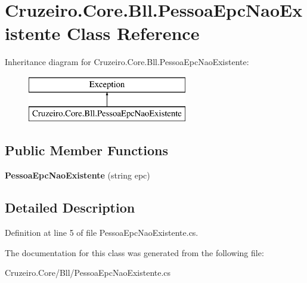 \hypertarget{class_cruzeiro_1_1_core_1_1_bll_1_1_pessoa_epc_nao_existente}{}\section{Cruzeiro.\+Core.\+Bll.\+Pessoa\+Epc\+Nao\+Existente Class Reference}
\label{class_cruzeiro_1_1_core_1_1_bll_1_1_pessoa_epc_nao_existente}
Inheritance diagram for Cruzeiro.\+Core.\+Bll.\+Pessoa\+Epc\+Nao\+Existente\+:\begin{figure}[H]
\begin{center}
\leavevmode
\includegraphics[height=2.000000cm]{class_cruzeiro_1_1_core_1_1_bll_1_1_pessoa_epc_nao_existente}
\end{center}
\end{figure}
\subsection*{Public Member Functions}
\begin{DoxyCompactItemize}
\item 
{\bfseries Pessoa\+Epc\+Nao\+Existente} (string epc)\hypertarget{class_cruzeiro_1_1_core_1_1_bll_1_1_pessoa_epc_nao_existente_af2b5bbc72701138c5b437949f446e6ab}{}\label{class_cruzeiro_1_1_core_1_1_bll_1_1_pessoa_epc_nao_existente_af2b5bbc72701138c5b437949f446e6ab}

\end{DoxyCompactItemize}


\subsection{Detailed Description}


Definition at line 5 of file Pessoa\+Epc\+Nao\+Existente.\+cs.



The documentation for this class was generated from the following file\+:\begin{DoxyCompactItemize}
\item 
Cruzeiro.\+Core/\+Bll/Pessoa\+Epc\+Nao\+Existente.\+cs\end{DoxyCompactItemize}
